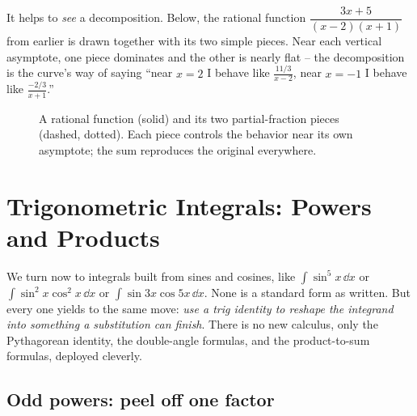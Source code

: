 It helps to \emph{see} a decomposition. Below, the rational function
$\dfrac{3x+5}{(x-2)(x+1)}$ from earlier is drawn together with its two simple
pieces. Near each vertical asymptote, one piece dominates and the other is
nearly flat -- the decomposition is the curve's way of saying ``near $x=2$ I
behave like $\tfrac{11/3}{x-2}$, near $x=-1$ I behave like
$\tfrac{-2/3}{x+1}$.''

\begin{figure}[H]
\centering
{}
\caption{A rational function (solid) and its two partial-fraction pieces
(dashed, dotted). Each piece controls the behavior near its own asymptote; the
sum reproduces the original everywhere.}
\label{ch24:fig-decomp}
\end{figure}

\section{Trigonometric Integrals: Powers and Products}
\label{ch24:trig-integrals}

We turn now to integrals built from sines and cosines, like
$\int \sin^5 x\,\dd x$ or $\int \sin^2 x\cos^2 x\,\dd x$ or
$\int \sin 3x\cos 5x\,\dd x$. None is a standard form as written. But every one
yields to the same move: \emph{use a trig identity to reshape the
integrand into something a substitution can finish}. There is no new calculus,
only the Pythagorean identity, the double-angle formulas, and the
product-to-sum formulas, deployed cleverly.

\subsection{Odd powers: peel off one factor}

